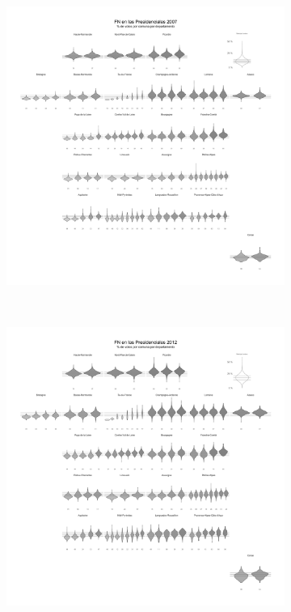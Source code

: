 \begin{figure}[h]
	\centering
	\begin{subfigure}{0.4\textwidth}
	\includegraphics[width = \textwidth]{Figs/AED/Geofacet_Distr_por_Dpto_P07_FN}
	\end{subfigure}
	~
	\begin{subfigure}{0.4\textwidth}
	\includegraphics[width = \textwidth]{Figs/AED/Geofacet_Distr_por_Dpto_P12_FN}

\end{subfigure}
\end{figure}
